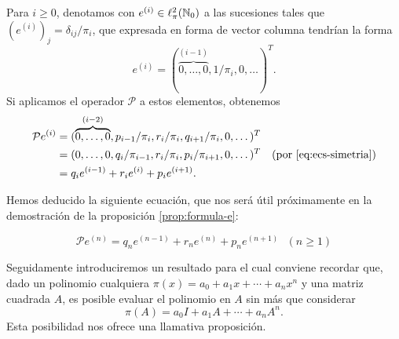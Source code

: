     Para $i\geq 0$, denotamos con $e^{(i)}\in\ell^2_\pi(\mathbb{N}_0)$ a las sucesiones tales que $(e^{(i)})_j = \delta_{ij}/\pi_i$, que expresada en forma de vector columna tendrían la forma
    $$
    e^{(i)}=(\overbrace{0,\dots,0}^{(i-1)},1/\pi_i,0,\dots)^T.
    $$
    Si aplicamos el operador $\mathcal{P}$ a estos elementos, obtenemos
    \begin{equation*}
        \begin{split}
            \mathcal{P}e^{(i)} &= (\overbrace{0,\dots,0}^{(i-2)}, p_{i-1}/\pi_i, r_i/\pi_i, q_{i+1}/\pi_i,0,\dots)^T \\
            &= (0,\dots,0, q_i/\pi_{i-1},  r_i/\pi_i, p_i/\pi_{i+1},0,\dots)^T \ \ \ \text{(por \eqref{eq:ecs-simetria})}\\
            &= q_i e^{(i-1)} + r_i e^{(i)} + p_i e^{(i+1)}.
        \end{split}
    \end{equation*}

    Hemos deducido la siguiente ecuación, que nos será útil próximamente en la demostración de la proposición \ref{prop:formula-e}:

    \begin{equation}
        \label{eq:Pen}
        \mathcal{P}e^{(n)} =  q_n e^{(n-1)} + r_n  e^{(n)} + p_n e^{(n+1)} \ \ \ (n\geq 1)
    \end{equation}

    Seguidamente introduciremos un resultado para el cual conviene recordar que, dado un polinomio cualquiera $\pi(x)= a_0 + a_1 x + \cdots + a_n x^n$ y una matriz cuadrada $A$, es posible evaluar el polinomio en $A$ sin más que considerar
    $$
    \pi(A) = a_0 I + a_1 A + \cdots + a_n A^n.
    $$
    Esta posibilidad nos ofrece una llamativa proposición.

